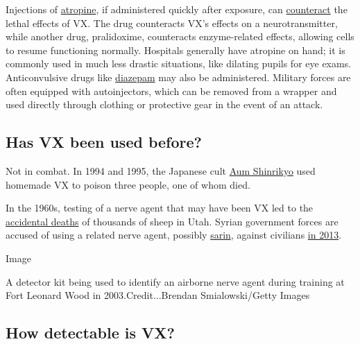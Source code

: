 Injections of
\href{https://pubchem.ncbi.nlm.nih.gov/compound/atropine}{atropine}, if
administered quickly after exposure, can
\href{http://www.popularmechanics.com/science/health/a9388/how-it-works-atropine-the-nerve-gas-antidote-15859092/}{counteract}
the lethal effects of VX. The drug counteracts VX's effects on a
neurotransmitter, while another drug, pralidoxime, counteracts
enzyme-related effects, allowing cells to resume functioning normally.
Hospitals generally have atropine on hand; it is commonly used in much
less drastic situations, like dilating pupils for eye exams.
Anticonvulsive drugs like
\href{https://pubchem.ncbi.nlm.nih.gov/compound/3016\#section=Therapeutic-Uses}{diazepam}
may also be administered. Military forces are often equipped with
autoinjectors, which can be removed from a wrapper and used directly
through clothing or protective gear in the event of an attack.

\hypertarget{has-vx-been-used-before}{%
\subsection{Has VX been used before?}\label{has-vx-been-used-before}}

Not in combat. In 1994 and 1995, the Japanese cult
\href{http://www.japantimes.co.jp/news/2015/03/14/national/history/cult-attraction-aum-shinrikyos-power-persuasion/\#.WK--yW996po}{Aum
Shinrikyo} used homemade VX to poison three people, one of whom died.

In the 1960s, testing of a nerve agent that may have been VX led to the
\href{http://query.nytimes.com/gst/abstract.html?res=9F05E7DF1639EF3BBC4A51DFB3668382679EDE\&legacy=true}{accidental
deaths} of thousands of sheep in Utah. Syrian government forces are
accused of using a related nerve agent, possibly
\href{https://emergency.cdc.gov/agent/sarin/}{sarin}, against civilians
\href{http://www.nytimes.com/2013/12/29/world/middleeast/new-study-refines-view-of-sarin-attack-in-syria.html}{in
2013}.

Image

A detector kit being used to identify an airborne nerve agent during
training at Fort Leonard Wood in 2003.Credit...Brendan Smialowski/Getty
Images

\hypertarget{how-detectable-is-vx}{%
\subsection{How detectable is VX?}\label{how-detectable-is-vx}}


